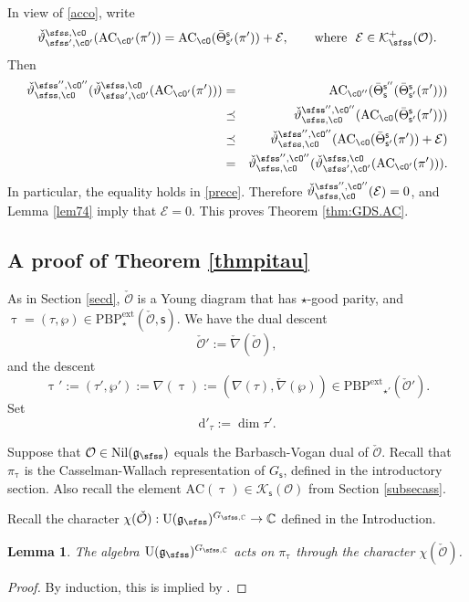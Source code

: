 \documentclass[12pt,a4paper]{amsart}
\newcommand{\CE}{{\mathcal {E}}}
\newcommand{\CK}{{\mathcal {K}}}
\newcommand{\CO}{{\mathcal {O}}}
\newcommand{\oU}{\operatorname{U}}
\newcommand{\g}{\mathfrak g}
\def\DD{\nabla}
\numberwithin{equation}{section}
\newtheorem{lem}[thm]{Lemma}
\theoremstyle{remark}
\def\Thetab{\bar{\Theta}}
\def\PBPe{\mathrm{PBP}^{\mathrm{ext}}}
\def\ckDD{{\check\DD}}
\begin{document}
In view of \eqref{acco}, write 
\[
  \check \vartheta_{\sfss', \cO'}^{\sfss, \cO}(\mathrm{AC}_{\cO'}(\pi'))=\mathrm{AC}_{\cO}( \Thetab_{\mathsf s'}^{\mathsf s}(\pi'))+\CE,\qquad\textrm{where $\ \CE\in \CK^+_\sfss(\CO)$}.
\]
Then 
\begin{eqnarray}
\nonumber \check \vartheta_{\sfss, \cO}^{\sfss'', \cO''}(\check \vartheta_{\sfss', \cO'}^{\sfss, \cO}(\mathrm{AC}_{\cO'}(\pi')))
\nonumber &=&\mathrm{AC}_{\cO''}( \Thetab_{\mathsf s}^{\mathsf s''}(\Thetab_{\mathsf s'}^{\mathsf s}(\pi')))\\
\nonumber &\preceq &  \check \vartheta_{\sfss, \cO}^{\sfss'', \cO''}(\mathrm{AC}_{\cO}( \Thetab_{\mathsf s'}^{\mathsf s}(\pi')))\\
\label{prece}  &\preceq &  \check \vartheta_{\sfss, \cO}^{\sfss'', \cO''}(\mathrm{AC}_{\cO}( \Thetab_{\mathsf s'}^{\mathsf s}(\pi'))+\CE)\\
\nonumber &=&\check \vartheta_{\sfss, \cO}^{\sfss'', \cO''}(\check \vartheta_{\sfss', \cO'}^{\sfss, \cO}(\mathrm{AC}_{\cO'}(\pi'))).
\end{eqnarray}
In particular,  the equality holds in \eqref{prece}. Therefore  $\check \vartheta_{\sfss, \cO}^{\sfss'', \cO''}(\CE)=0$, and 
Lemma \ref{lem74} imply that $\CE=0$. This proves Theorem \ref{thm:GDS.AC}. 



 
 \subsection{A proof of Theorem \ref{thmpitau} }\label{sec:comANDgeo}
  As in Section \ref{secd}, $\check \CO$ is a Young diagram that has $\star$-good parity,   and 
$\uptau=(\tau, \wp)\in \PBPe_\star(\check \CO,\mathsf s)$.  We have the dual descent 
\[
  \check \CO':=\check \nabla(\check \CO), 
\]
and the descent 
 \[
  \uptau' := (\tau',\wp'):=\nabla(\uptau):= (\DD(\tau), \ckDD(\wp))\in \mathrm{\PBPe}_{\star'}(\check \CO').
 \]
 Set
 \[
  \mathrm d'_\tau:=
    \dim \tau'.
    \]

Suppose that $\CO\in \mathrm{Nil}(\g_\sfss)$ equals the Barbasch-Vogan dual of $\check \CO$.   Recall that $\pi_\uptau$ is the Casselman-Wallach representation of $G_{\mathsf s}$, defined in the introductory section. 
Also recall the element $\mathrm{AC}(\uptau)\in \CK_{\mathsf s}(\CO)$ from Section \ref{subsecass}.

Recall the character $\chi(\check \CO): \oU(\g_\sfss)^{G_{\sfss, \C}}\rightarrow \C$  defined in the Introduction.
\begin{lem}\label{inf1}
The algebra $\oU(\g_\sfss)^{G_{\sfss, \C}}$ acts on $\pi_\uptau$ through the character $\chi(\check \CO)$.%
\end{lem}
\begin{proof}
By induction, this is implied by \cite[Theorem
1.19]{PrzInf}.
\end{proof}
\end{document}
